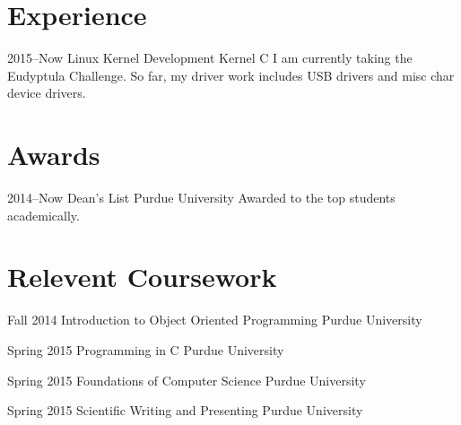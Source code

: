 \documentclass[]{friggeri-cv} %
\begin{document}

\section{Experience}

\begin{entrylist}

\entry
{2015--Now}
{Linux Kernel Development}
{Kernel C}
{I am currently taking the Eudyptula Challenge. So far, my driver work includes USB drivers and misc char device drivers.}

\end{entrylist}

\section{Awards}

\begin{entrylist}


\entry
{2014--Now}
{Dean's List}
{Purdue University}
{Awarded to the top students academically.}


\end{entrylist}


\section{Relevent Coursework}

\begin{entrylist}


\entry
{Fall 2014}
{Introduction to Object Oriented Programming}
{Purdue University}


\entry
{Spring 2015}
{Programming in C}
{Purdue University}


\entry
{Spring 2015}
{Foundations of Computer Science}
{Purdue University}


\entry
{Spring 2015}
{Scientific Writing and Presenting}
{Purdue University}


\end{entrylist}
\end{document}

